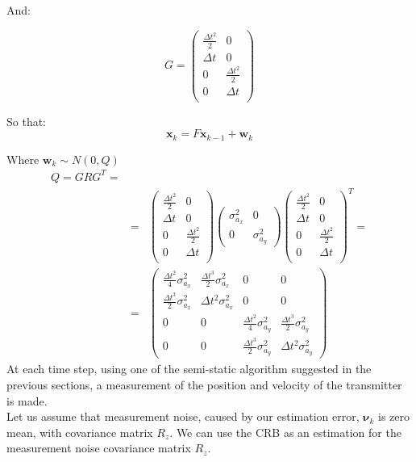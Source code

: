 And:

\begin{equation}
G = 
\begin{pmatrix} 
\frac{\Delta t^2}{2} & 0 \\
\Delta t & 0\\
0 & \frac{\Delta t^2}{2}\\
0& \Delta t\\
\end{pmatrix}
\end{equation}

So that:
\begin{equation}
\mathbf{x}_{k} = F \mathbf{x}_{k-1}+\mathbf{w}_{k}
\end{equation}

Where $\mathbf{w}_{k} \sim N(0,Q)$
\begin{eqnarray}
Q = GRG^T = \\
&=& \begin{pmatrix} 
\frac{\Delta t^2}{2} & 0 \\
\Delta t & 0\\
0 & \frac{\Delta t^2}{2}\\
0& \Delta t\\
\end{pmatrix} 
\begin{pmatrix} \sigma^2_{a_x} & 0 \\ 0 & \sigma^2_{a_y} \end{pmatrix}
\begin{pmatrix} 
\frac{\Delta t^2}{2} & 0 \\
\Delta t & 0\\
0 & \frac{\Delta t^2}{2}\\
0& \Delta t\\
\end{pmatrix} ^T  = \nonumber \\
&=& 
\begin{pmatrix}
\frac{\Delta t^2}{4}\sigma^2_{a_x} &\frac{\Delta t^3}{2}\sigma^2_{a_x} &0&0\\
\frac{\Delta t^3}{2}\sigma^2_{a_x} & \Delta t^2 \sigma^2_{a_x}&0&0 \\
0&0& \frac{\Delta t^2}{4}\sigma^2_{a_y} &\frac{\Delta t^3}{2}\sigma^2_{a_y}\\
0&0&\frac{\Delta t^3}{2}\sigma^2_{a_y} & \Delta t^2 \sigma^2_{a_y}
\end{pmatrix} \nonumber
\end{eqnarray}
At each time step, using one of the semi-static algorithm suggested in the previous sections, a
measurement of the position and velocity of the transmitter is made.
\\
Let us assume that measurement noise, caused by our estimation error, $\mathbf{\nu}_{k}$ is
zero mean, with covariance matrix $R_z$. We can use the CRB as an estimation for the measurement noise covariance matrix $R_z$.\\

